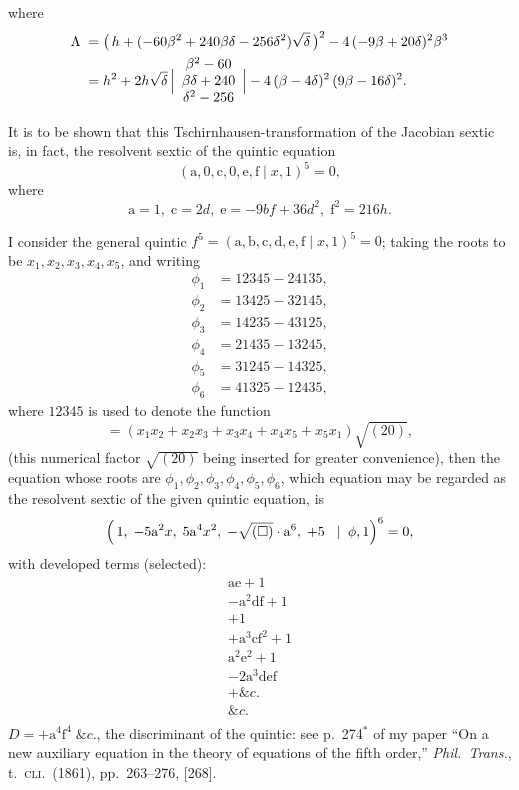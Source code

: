\documentclass[11pt]{article}
\begin{document}
\medskip
where
\begin{align*}
\Lambda \;=\;& \bigl(\,h+(-60\beta^{2}+240\beta\delta-256\delta^{2})\sqrt{\delta}\,\bigr)^{2}-4\,(-9\beta+20\delta)^{2}\beta^{3}\\
=\;& h^{2}+2h\sqrt{\delta}\,\Bigl|\begin{array}{c}\beta^{2}-60\\ \beta\delta+240\\ \delta^{2}-256\end{array}\Bigr|-4\,(\beta-4\delta)^{2}\,(9\beta-16\delta)^{2}.
\end{align*}

\medskip
It is to be shown that this Tschirnhausen-transformation of the
Jacobian sextic is, in fact, the resolvent sextic of the quintic
equation
\[
  (\mathrm{a},0,\mathrm{c},0,\mathrm{e},\mathrm{f}\mid x,1)^{5}=0,
\]
where
\[
  \mathrm{a}=1,\;\mathrm{c}=2d,\;\mathrm{e}=-9bf+36d^{2},\;\mathrm{f}^{2}=216h.
\]

\newpage
\noindent
I consider the general quintic $f^{5}=(\mathrm{a},\mathrm{b},
\mathrm{c},\mathrm{d},\mathrm{e},\mathrm{f}\mid x,1)^{5}=0$; taking
the roots to be $x_{1},x_{2},x_{3},x_{4},x_{5}$, and writing
\begin{align*}
  \phi_{1} &= 12345-24135,\\
  \phi_{2} &= 13425-32145,\\
  \phi_{3} &= 14235-43125,\\
  \phi_{4} &= 21435-13245,\\
  \phi_{5} &= 31245-14325,\\
  \phi_{6} &= 41325-12435,
\end{align*}
where $12345$ is used to denote the function
\[
  =(x_{1}x_{2}+x_{2}x_{3}+x_{3}x_{4}+x_{4}x_{5}+x_{5}x_{1})\sqrt{(20)},
\]
(this numerical factor $\sqrt{(20)}$ being inserted for greater
convenience), then the equation whose roots are
$\phi_{1},\phi_{2},\phi_{3},\phi_{4},\phi_{5},\phi_{6}$, which
equation may be regarded as the resolvent sextic of the given
quintic equation, is
\[
\Bigl(\,1,\;-5\mathrm{a}^{2}x,\;5\mathrm{a}^{4}x^{2},\;-\sqrt{(\square)}\cdot\mathrm{a}^{6},\;+5\;\;\mid\;\phi,1\Bigr)^{6}=0,
\]
with developed terms (selected):
\[
\begin{array}{l}
\mathrm{ae}+1\\
-\mathrm{a}^{2}\mathrm{df}+1\\
+1\\
+\mathrm{a}^{3}\mathrm{cf}^{2}+1\\
\mathrm{a}^{2}\mathrm{e}^{2}+1\\
-2\mathrm{a}^{3}\mathrm{def}\\
+ \&c.\\
\&c.\\
\end{array}
\]
$D=+\mathrm{a}^{4}\mathrm{f}^{4}\;\&c.$, the discriminant of the
quintic: see p.~274$^{*}$ of my paper ``On a new auxiliary equation
in the theory of equations of the fifth order,'' \textit{Phil.\
Trans.}, t.~\textsc{cli}.\ (1861), pp.\ 263--276, [268].
\end{document}
